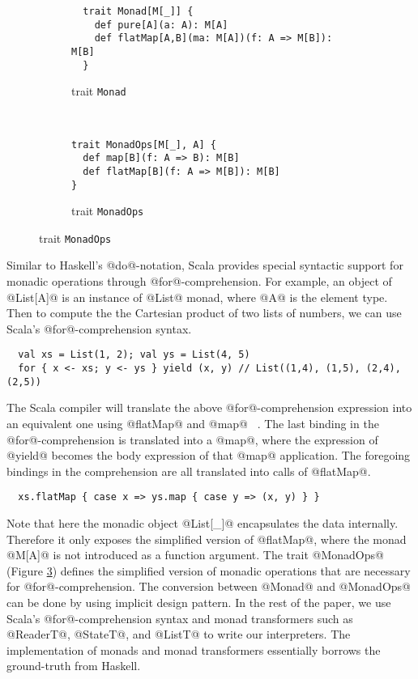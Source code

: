 \begin{figure}[h!]
  \centering
  \begin{subfigure}[b]{0.55\textwidth}
    \begin{lstlisting}
  trait Monad[M[_]] {                                  
    def pure[A](a: A): M[A]                            
    def flatMap[A,B](ma: M[A])(f: A => M[B]): M[B]     
  }                                                    
    \end{lstlisting}
    \caption{trait \texttt{Monad}} \label{fig:monad}
  \end{subfigure}
  ~
  \begin{subfigure}[b]{0.4\textwidth}
    \begin{lstlisting}
trait MonadOps[M[_], A] {
  def map[B](f: A => B): M[B]
  def flatMap[B](f: A => M[B]): M[B]
}
    \end{lstlisting}
    \caption{trait \texttt{MonadOps}} \label{fig:monadops}
  \end{subfigure}
\end{figure}

Similar to Haskell's @do@-notation, Scala provides special syntactic support for
monadic operations through @for@-comprehension.
For example, an object of @List[A]@ is an instance of @List@ monad, where @A@ is the element type. 
Then to compute the the Cartesian product of two lists of numbers, we can use Scala's
@for@-comprehension syntax.

\begin{lstlisting}
  val xs = List(1, 2); val ys = List(4, 5)
  for { x <- xs; y <- ys } yield (x, y) // List((1,4), (1,5), (2,4), (2,5))
\end{lstlisting}

The Scala compiler will translate the above @for@-comprehension expression into
an equivalent one using @flatMap@ and @map@ ~\cite{scala_spec}. The last binding
in the @for@-comprehension is translated into a @map@, where the expression of
@yield@ becomes the body expression of that @map@ application. The foregoing
bindings in the comprehension are all translated into calls of @flatMap@.

\begin{lstlisting}
  xs.flatMap { case x => ys.map { case y => (x, y) } }
\end{lstlisting}

Note that here the monadic object @List[_]@ encapsulates the data internally.
Therefore it only exposes the simplified version of @flatMap@, where the
monad @M[A]@ is not introduced as a function argument. The trait @MonadOps@
(Figure \ref{fig:monadops}) defines the simplified version of monadic
operations that are necessary for @for@-comprehension. 
The conversion between @Monad@ and @MonadOps@ can be done by using implicit design pattern.
In the rest of the paper, we use Scala's @for@-comprehension syntax and monad
transformers such as @ReaderT@, @StateT@, and @ListT@ to write our interpreters.
The implementation of monads and monad transformers essentially borrows the
ground-truth from Haskell.

